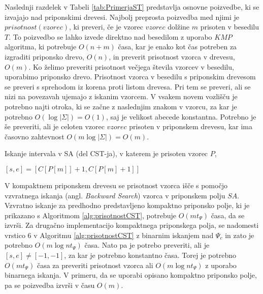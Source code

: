Naslednji razdelek v Tabeli \ref{tab:PrimerjaST} predstavlja osnovne poizvedbe, ki se izvajajo nad priponskimi drevesi. Najbolj preprosta poizvedba med njimi je $prisotnost(vzorec)$, ki preveri, če je vzorec $vzorec$ dolžine $m$ prisoten v besedilu $T$. To poizvedbo se lahko izvede direktno nad besedilom z uporabo $KMP$ algoritma, ki potrebuje $O(n+m)$ časa, kar je enako kot čas potreben za izgraditi priponsko drevo, $O(n)$, in preverit prisotnost vzorca v drevesu, $O(m)$. Ko želimo preveriti prisotnost večjega števila vzorcev v besedilu, uporabimo priponsko drevo. Prisotnost vzorca v besedilu s priponskim drevesom se preveri s sprehodom iz korena proti listom drevesa. Pri tem se preveri, ali se nizi na povezavah ujemajo z iskanim vzorcem. V vsakem novem vozlišču je potrebno najti otroka, ki se začne z naslednjim znakom v vzorcu, za kar je potrebno $O(\log|\Sigma|)=O(1)$, saj je velikost abecede konstantna. Potrebno je še preveriti, ali je celoten vzorec $vzorec$ prisoten v priponskem drevesu, kar ima časovno zahtevnost $O(m\log|\Sigma|)=O(m)$. 

\begin{algorithm}[htb]

\caption{Iskanje intervala v SA (del CST-ja), v katerem je prisoten vzorec $P$,  \cite{Navarro2016}}\label{alg:prisotnostCST}
{
    {$[s,e]=[C[P[m]]+1,C[P[m]+1]]$}
    

    {\KwRet{$[s,e]$}}
}

\end{algorithm}
V kompaktnem priponskem drevesu se prisotnost vzorca išče s pomočjo vzvratnega iskanja (angl. \textit{Backward Search}) vzorca v priponskem polju $SA$. Vzvratno iskanje za predhodno predstavljeno kompaktno priponsko polje, ki je prikazano s Algoritmom \ref{alg:prisotnostCST}, potrebuje $O(mt_\Psi)$ časa, da se izvrši. Za drugačno implementacijo kompaktnega priponskega polja, se nadomesti vrstico 6 v Algoritmu \ref{alg:prisotnostCST} z binarnim iskanjem nad $\Psi_c$ in zato je potrebno $O(m\log{n}t_\Psi)$ časa. Nato pa je potrebo preveriti, ali je $[s,e]\ne[-1,-1]$, za kar je potrebno konstantno časa. Torej je potrebno $O(mt_\Psi)$ časa za preveriti prisotnost vzorca ali $O(m\log{n}t_\Psi)$ z uporabo binarnega iskanja. V primeru, da se uporabi opisano kompaktno priponsko polje, pa se poizvedba izvrši v času $O(m)$.

